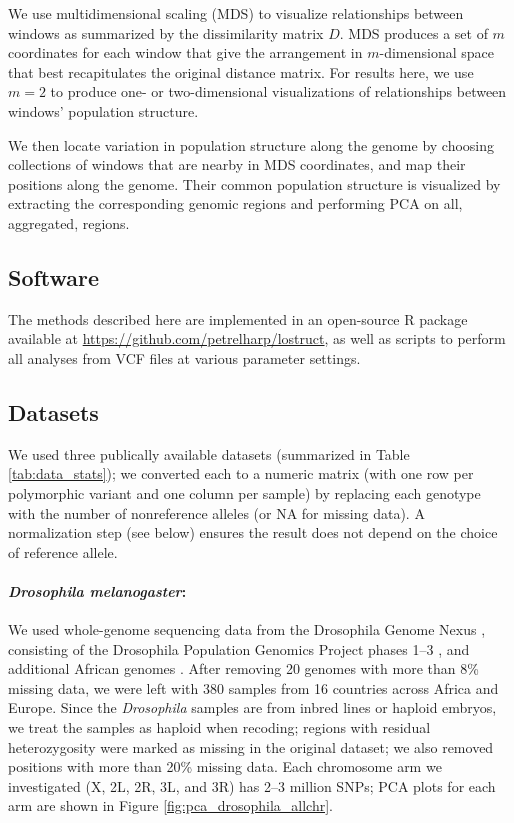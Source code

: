 \documentclass[11pt, oneside]{article}   	%
\begin{document}
We use multidimensional scaling (MDS) to visualize relationships between windows
as summarized by the dissimilarity matrix $D$.
MDS produces a set of $m$ coordinates for each window that
give the arrangement in $m$-dimensional space that best recapitulates the original distance matrix.
For results here, we use $m=2$ to produce one- or two-dimensional visualizations of relationships between windows' population structure.

We then locate variation in population structure along the genome
by choosing collections of windows that are nearby in MDS coordinates,
and map their positions along the genome.
Their common population structure is visualized by extracting the corresponding genomic regions
and performing PCA on all, aggregated, regions.


\subsection{Software}

The methods described here
are implemented in an open-source R package
available at \url{https://github.com/petrelharp/lostruct},
as well as scripts to perform all analyses from VCF files
at various parameter settings.


\subsection{Datasets}

We used three publically available datasets (summarized in Table \ref{tab:data_stats});
we converted each to a numeric matrix
(with one row per polymorphic variant and one column per sample)
by replacing each genotype with the number of nonreference alleles
(or NA for missing data).
A normalization step (see below) ensures the result does not depend on the choice of reference allele.

\paragraph{\textit{Drosophila melanogaster}:}
We used whole-genome sequencing data 
from the Drosophila Genome Nexus \citep[\url{http://www.johnpool.net/genomes.html},][]{lack2015drosophila},
consisting of the Drosophila Population Genomics Project phases 1--3 \citep{langley2012genomic,pool2012population},
and additional African genomes \citep{lack2015drosophila}.
After removing 20 genomes with more than 8\% missing data,
we were left with 380 samples from 16 countries across Africa and Europe.
Since the \textit{Drosophila} samples are from inbred lines or haploid embryos, 
we treat the samples as haploid when recoding;
regions with residual heterozygosity were marked as missing in the original dataset;
we also removed positions with more than 20\% missing data. 
Each chromosome arm we investigated (X, 2L, 2R, 3L, and 3R) has 2--3 million SNPs;
PCA plots for each arm are shown in Figure \ref{fig:pca_drosophila_allchr}.
\end{document}
